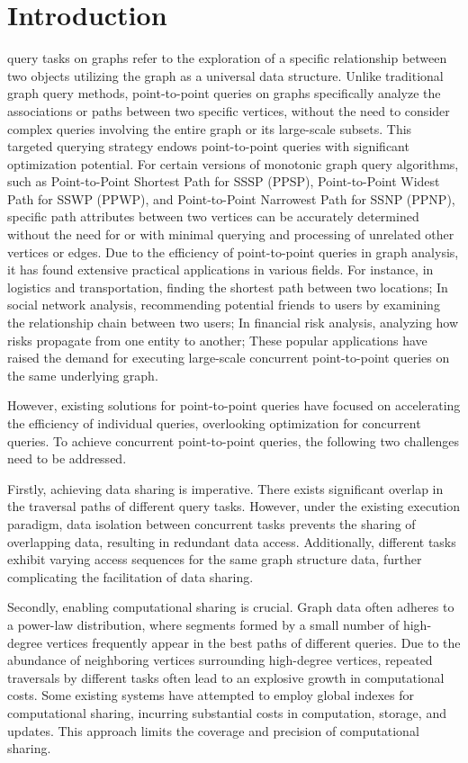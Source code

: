 \documentclass[lettersize,journal]{IEEEtran} %
\begin{document}
\section{Introduction}
 query tasks on graphs refer to the exploration of a specific relationship between two objects utilizing the graph as a universal data structure. Unlike traditional graph query methods, point-to-point queries on graphs specifically analyze the associations or paths between two specific vertices, without the need to consider complex queries involving the entire graph or its large-scale subsets. This targeted querying strategy endows point-to-point queries with significant optimization potential. For certain versions of monotonic graph query algorithms, such as Point-to-Point Shortest Path for SSSP (PPSP), Point-to-Point Widest Path for SSWP (PPWP), and Point-to-Point Narrowest Path for SSNP (PPNP), specific path attributes between two vertices can be accurately determined without the need for or with minimal querying and processing of unrelated other vertices or edges. Due to the efficiency of point-to-point queries in graph analysis, it has found extensive practical applications in various fields. For instance, in logistics and transportation, finding the shortest path between two locations; In social network analysis, recommending potential friends to users by examining the relationship chain between two users; In financial risk analysis, analyzing how risks propagate from one entity to another; These popular applications have raised the demand for executing large-scale concurrent point-to-point queries on the same underlying graph. 

However, existing solutions for point-to-point queries have focused on accelerating the efficiency of individual queries, overlooking optimization for concurrent queries. To achieve concurrent point-to-point queries, the following two challenges need to be addressed.

Firstly, achieving data sharing is imperative. There exists significant overlap in the traversal paths of different query tasks. However, under the existing execution paradigm, data isolation between concurrent tasks prevents the sharing of overlapping data, resulting in redundant data access. Additionally, different tasks exhibit varying access sequences for the same graph structure data, further complicating the facilitation of data sharing.

Secondly, enabling computational sharing is crucial. Graph data often adheres to a power-law distribution, where segments formed by a small number of high-degree vertices frequently appear in the best paths of different queries. Due to the abundance of neighboring vertices surrounding high-degree vertices, repeated traversals by different tasks often lead to an explosive growth in computational costs. Some existing systems have attempted to employ global indexes for computational sharing, incurring substantial costs in computation, storage, and updates. This approach limits the coverage and precision of computational sharing.
\end{document}
